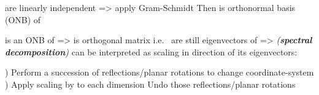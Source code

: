 \begin{itemize}
\begin{itemize}
                        \begin{itemize}

                              \vItem
                                     are linearly
                                    independent => apply Gram-Schmidt
                              \vItem
                                    Then  is
                                    orthonormal basis (ONB) of 
                        \end{itemize}
                  \vItem
                         is
                        an ONB of  =>
                         is
                        orthogonal matrix i.e.~
                  \vItem
                         are still eigenvectors
                        of  => 
                        \emph{(\textbf{spectral decomposition})}
                  \vItem
                         can be interpreted as scaling
                        in direction of its eigenvectors:

                        \begin{enumerate}
                              )
                                    Perform a succession of reflections/planar rotations to change
                                    coordinate-system
                              )
                                    Apply scaling by  to each dimension
                              \vItem
                                    Undo those reflections/planar rotations
                        \end{enumerate}
            \end{itemize}
\end{itemize}